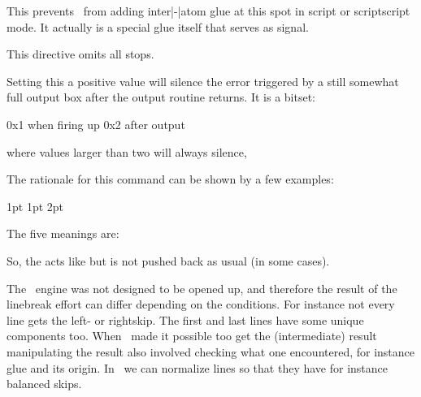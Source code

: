 This prevents \TEX\ from adding inter|-|atom glue at this spot in script or
scriptscript mode. It actually is a special glue itself that serves as signal.

\stopoldprimitive

\startoldprimitive[title={\prm {nonstopmode}}]

This directive omits all stops.

\stopoldprimitive

\startnewprimitive[title={\prm {nooutputboxerror}}]

Setting this a positive value will silence the error triggered by a still
somewhat full output box after the output routine returns. It is a bitset:

\starttabulate[|T||]
\NC 0x1 \NC when firing up \NC \NR
\NC 0x2 \NC after output   \NC \NR
\stoptabulate

where values larger than two will always silence,

\stopnewprimitive

\startnewprimitive[title={\prm {norelax}}]

The rationale for this command can be shown by a few examples:

\startbuffer
{} 1pt  1pt  2pt
\edef\testa{\ifdim\dimen0=\dimen2\norelax N\else Y\fi}
\edef\testb{\ifdim\dimen0=\dimen2\relax   N\else Y\fi}
\edef\testc{\ifdim\dimen0=\dimen4\norelax N\else Y\fi}
\edef\testd{\ifdim\dimen0=\dimen4\relax   N\else Y\fi}
\edef\teste{\norelax}
\stopbuffer

\typebuffer

The five meanings are:

\start \getbuffer \starttabulate[|T|T|]
\NC \string\testa \NC \meaning\testa \NC \NR
\NC \string\testb \NC \meaning\testb \NC \NR
\NC \string\testc \NC \meaning\testc \NC \NR
\NC \string\testd \NC \meaning\testd \NC \NR
\NC \string\teste \NC \meaning\teste \NC \NR
\stoptabulate \stop

So, the  acts like  but is not pushed back as
usual (in some cases).

\stopnewprimitive

\startnewprimitive[title={\prm {normalizelinemode}}]

The \TEX\ engine was not designed to be opened up, and therefore the result of
the linebreak effort can differ depending on the conditions. For instance not
every line gets the left- or rightskip. The first and last lines have some unique
components too. When \LUATEX\ made it possible too get the (intermediate) result
manipulating the result also involved checking what one encountered, for instance
glue and its origin. In \LUAMETATEX\ we can normalize lines so that they have for
instance balanced skips.

